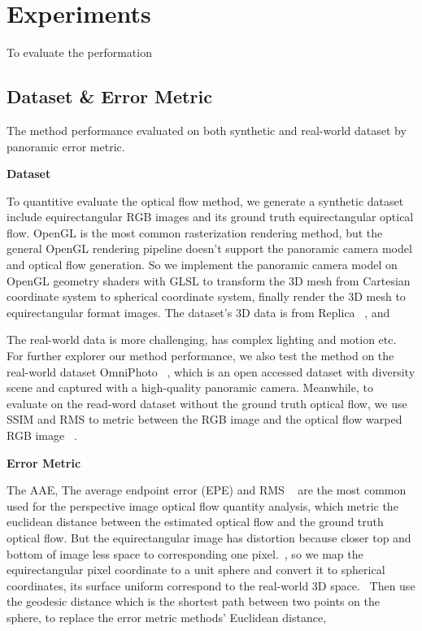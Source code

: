 \section{Experiments}\label{sec:exp}

To evaluate the performation

\subsection{Dataset \& Error Metric}

The method performance evaluated on both synthetic and real-world dataset by panoramic error metric.

\textbf{Dataset}

To quantitive evaluate the optical flow method, we generate a synthetic dataset include equirectangular RGB images and its ground truth equirectangular optical flow.
OpenGL is the most common rasterization rendering method, but the general OpenGL rendering pipeline doesn't support the panoramic camera model and optical flow generation.
So we implement the panoramic camera model on OpenGL geometry shaders with GLSL to transform the 3D mesh from Cartesian coordinate system to spherical coordinate system, finally render the 3D mesh to equirectangular format images.
The dataset's 3D data is from Replica ~\cite{??}, and 

The real-world data is more challenging, has complex lighting and motion etc. 
For further explorer our method performance,  we also test the method on the real-world dataset OmniPhoto ~\cite{??}, which is an open accessed dataset with diversity scene and captured with a high-quality panoramic camera.
Meanwhile, to evaluate on the read-word dataset without the ground truth optical flow, we use SSIM and RMS to metric between the RGB image and the optical flow warped RGB image ~\cite{???}.

\textbf{Error Metric}

The AAE, The average endpoint error (EPE) and RMS  ~\cite{BakerSLRBS2011} are the most common used for the perspective image optical flow quantity analysis, which metric the euclidean distance between the estimated optical flow and the ground truth optical flow.
But the equirectangular image has distortion because closer top and bottom of image less space to corresponding one pixel.~\cite{??},
so we map the equirectangular pixel coordinate to a unit sphere and convert it to spherical coordinates, its surface uniform correspond to the real-world 3D space.~\cite{??}
Then use the geodesic distance which is the shortest path between two points on the sphere,  to replace the error metric methods' Euclidean distance, 

